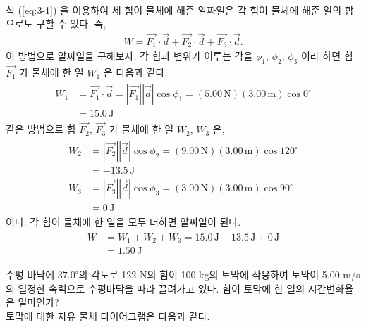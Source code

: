 \documentclass[floatfix,nofootinbib,superscriptaddress,fleqn]{revtex4-2}
\begin{document}
 \\
  식 (\ref{eq:3-1}) 을 이용하여 세 힘이 물체에 해준 알짜일은 각 힘이 물체에 해준 일의 
합으로도 구할 수 있다. 즉,
\begin{align}
  W = \vec{F_1}\cdot\vec{d}+\vec{F_2}\cdot\vec{d}+\vec{F_3}\cdot\vec{d}.
\end{align}
이 방법으로 알짜일을 구해보자. 각 힘과 변위가 이루는 각을 
$\phi_1$, $\phi_2$, $\phi_3$ 이라 하면
 힘 $\vec{F_1}$ 가 물체에 한 일 $W_1$ 은 다음과 같다.
\begin{align}
  \begin{split}
    W_1 &= \vec{F_1}\cdot\vec{d} = |\vec{F_1}||\vec{d}|\cos{\phi_1}
    =(5.00\,\mathrm{N})(3.00\,\mathrm{m})\cos{0^\circ}  \\
    &=15.0\,\mathrm{J}
  \end{split}
\end{align}
같은 방법으로 힘 $\vec{F_2}$, $\vec{F_3}$ 가 물체에 한 일 $W_2$, $W_3$ 은,
\begin{align}
  \begin{split}
    W_2 &= |\vec{F_2}||\vec{d}|\cos{\phi_2}
    =(9.00\,\mathrm{N})(3.00\,\mathrm{m})\cos{120^\circ}  \\
    &=-13.5\,\mathrm{J} \\
    W_3 &= |\vec{F_3}||\vec{d}|\cos{\phi_3}
    =(3.00\,\mathrm{N})(3.00\,\mathrm{m})\cos{90^\circ}  \\
    &=0\,\mathrm{J}
  \end{split}
\end{align}
이다. 각 힘이 물체에 한 일을 모두 더하면 알짜일이 된다.
\begin{align}
  \begin{split}
    W &= W_1+W_2+W_3 = 15.0\,\mathrm{J}-13.5\,\mathrm{J}+0\,\mathrm{J} \\
    &= 1.50\,\mathrm{J}
  \end{split}
  \end{align}

\vspace{1.cm}

수평 바닥에 $37.0^\circ$의 각도로 122 N의 힘이 100 kg의 토막에
작용하여 토막이 5.00 m/s의 일정한 속력으로 수평바닥을 따라 끌려가고
있다. 힘이 토막에 한 일의 시간변화율은 얼마인가?  \\


 토막에 대한 자유 물체 다이어그램은 다음과 같다.
\end{document}
